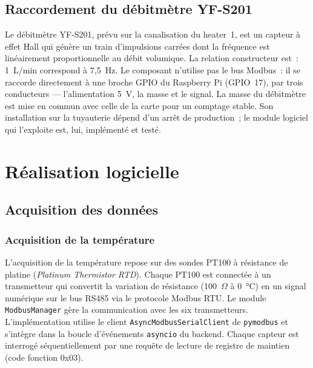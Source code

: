 \subsection{Raccordement du débitmètre YF-S201}

Le débitmètre YF-S201, prévu sur la canalisation du heater~1, est un capteur à effet Hall qui génère un train d'impulsions carrées dont la fréquence est linéairement proportionnelle au débit volumique. La relation constructeur est~: 1~L/min correspond à 7,5~Hz. Le composant n'utilise pas le bus Modbus~: il se raccorde directement à une broche GPIO du Raspberry Pi (GPIO~17), par trois conducteurs --- l'alimentation 5~V, la masse et le signal. La masse du débitmètre est mise en commun avec celle de la carte pour un comptage stable. Son installation sur la tuyauterie dépend d'un arrêt de production~; le module logiciel qui l'exploite est, lui, implémenté et testé.

\section{Réalisation logicielle}

\subsection{Acquisition des données}

\subsubsection{Acquisition de la température}

L'acquisition de la température repose sur des sondes PT100 à résistance de platine (\emph{Platinum Thermistor RTD}). Chaque PT100 est connectée à un transmetteur qui convertit la variation de résistance (100~$\Omega$ à 0~\si{\celsius}) en un signal numérique sur le bus RS485 via le protocole Modbus RTU. Le module \texttt{ModbusManager} gère la communication avec les six transmetteurs. L'implémentation utilise le client \texttt{AsyncModbusSerialClient} de \texttt{pymodbus} et s'intègre dans la boucle d'événements \texttt{asyncio} du backend. Chaque capteur est interrogé séquentiellement par une requête de lecture de registre de maintien (code fonction 0x03).

